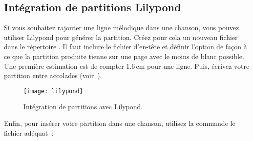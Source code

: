 \subsection{Intégration de partitions Lilypond}

Si vous souhaitez rajouter une ligne mélodique dans une chanson, vous
pouvez utiliser Lilypond pour générer la partition. Créez pour cela
un nouveau fichier  dans le répertoire
. Il faut inclure le fichier d'en-tête
 et définir l'option  de façon à ce que la
partition produite tienne sur une page avec le moins de blanc
possible. Une première estimation est de compter 1.6\,cm pour une
ligne. Puis, écrivez votre partition entre accolades
(voir~).

\begin{figure}
  \begin{minipage}[b]{\linewidth}
    \centering
    \texttt{[image: lilypond]}
    \vspace{0.5cm}
  \end{minipage}

  \begin{minipage}[b]{\linewidth}
  \end{minipage}
  \caption{Intégration de partitions avec Lilypond.}
  \label{fig:lilypond}
\end{figure}

Enfin, pour insérer votre partition  dans une
chanson, utilisez la commande  le fichier
 adéquat~:

\begin{songbook}
\end{songbook}

